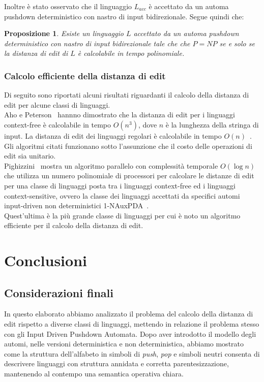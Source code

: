 \documentclass[a4paper,12pt]{report}
\theoremstyle{propositionstyle}
\newtheorem{prop}{Proposizione}[chapter]
\begin{document}
    Inoltre è stato osservato che il linguaggio $L_{acc}$ è accettato da un automa pushdown deterministico con nastro di input bidirezionale.
    Segue quindi che:

    \begin{prop}
        Esiste un linguaggio $L$ accettato da un automa pushdown deterministico con nastro di input bidirezionale tale che che $P = NP$ se e solo se
        la distanza di edit di $L$ è calcolabile in tempo polinomiale.
    \end{prop}

    \subsection{Calcolo efficiente della distanza di edit}

    Di seguito sono riportati alcuni risultati riguardanti il calcolo della distanza di edit per alcune classi di linguaggi. \\
    Aho e Peterson~\cite{aho-peterson} hannno dimostrato che la distanza di edit per i linguaggi context-free è calcolabile in tempo $O(n^3)$, dove $n$ è la lunghezza della stringa di input.
    La distanza di edit dei linguaggi regolari è calcolabile in tempo $O(n)$~\cite{wagner}. \\
    Gli algoritmi citati funzionano sotto l'assunzione che il costo delle operazioni di edit sia unitario. \\
    Pighizzini~\cite{pighizzini} mostra un algoritmo parallelo con complessità temporale $O(\log n)$ che utilizza un numero polinomiale di processori per calcolare
    le distanze di edit per una classe di linguaggi posta tra i linguaggi context-free ed i linguaggi context-sensitive, ovvero la classe dei linguaggi accettati da specifici automi input-driven non deterministici 1-NAuxPDA~\cite{brandenburg}. \\
    Quest'ultima è la più grande classe di linguaggi per cui è noto un algoritmo efficiente per il calcolo della distanza di edit.


    \chapter{Conclusioni}


    \section{Considerazioni finali}

    In questo elaborato abbiamo analizzato il problema del calcolo della distanza di edit rispetto a diverse classi di linguaggi, mettendo in relazione il problema stesso con gli Input Driven Pushdown Automata.
    Dopo aver introdotto il modello degli automi, nelle versioni deterministica e non deterministica, abbiamo mostrato come la struttura dell’alfabeto in simboli di \textit{push}, \textit{pop} e simboli neutri consenta di descrivere linguaggi con struttura annidata e corretta parentesizzazione, mantenendo al contempo una semantica operativa chiara.
\end{document}
